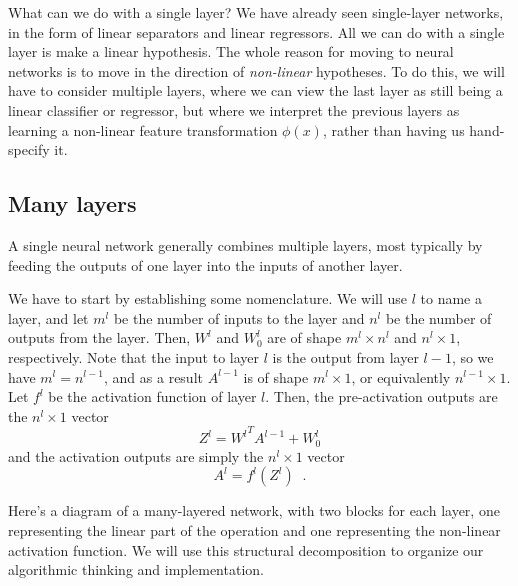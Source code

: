 \documentclass[11pt]{article}
\begin{document}
What can we do with a single layer?  We have already seen single-layer
networks, in the form of linear separators and linear regressors.  All
we can do with a single layer is make a linear hypothesis.
The whole reason for
moving to neural networks is to move in the direction of {\em
  non-linear} hypotheses.  To do this, we will have to consider
multiple layers, where we can view the last layer as still being a
linear classifier or regressor, but where we interpret the previous
layers as learning a non-linear feature transformation $\phi(x)$,
rather than having us hand-specify it.

\subsection{Many layers}
A single neural network generally combines multiple layers, most
typically by feeding the outputs of one layer into the inputs of
another layer.

We have to start by establishing some nomenclature.  We will use $l$
to name a layer, and let $m^l$ be the number of inputs to the
layer and $n^l$ be the number of outputs from the layer.  
Then, $W^l$ and $W^l_0$ are of shape $m^l \times
n^l$ and $n^l \times 1$, respectively. Note that the input to layer $l$ is the output from layer $l-1$, so we have $m^l= n^{l-1}$, and as a result $A^{l-1}$ is of shape $m^l \times 1$,  or equivalently $n^{l-1} \times 1$. Let $f^l$ be
the activation function of layer $l$. Then, the pre-activation outputs are the $n^l \times 1$
vector
\[Z^l = {W^l}^TA^{l-1} + W^l_0\]
and the activation outputs are simply the $n^l \times 1$ vector
\[A^l = f^l(Z^l)\;\;.\]

Here's a diagram of a many-layered network, with two blocks
for each layer, one representing the linear part of the operation and
one representing the non-linear activation function.  We will use this
structural decomposition to organize our algorithmic thinking and
implementation. 
\end{document}

